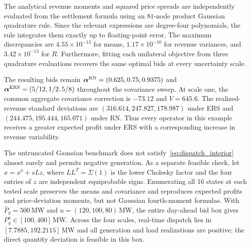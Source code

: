\documentclass[journal]{IEEEtran}
\begin{document}
\begin{table}[t]
\centering
\caption{Uncertainty sensitivity: full expected profits, including covariance offsets. Standard deviations are scaled by $s$; forecast means and prescribed coefficients are fixed.}
\label{tab:uncertainty_sensitivity}
\end{table}

The analytical revenue moments and squared price spreads are independently evaluated from the settlement formula using an $81$-node product Gaussian quadrature rule. Since the relevant expressions are degree-four polynomials, the rule integrates them exactly up to floating-point error. The maximum discrepancies are $4.55\times10^{-13}$ for means, $1.17\times10^{-10}$ for revenue variances, and $3.42\times10^{-13}$ for $R$. Furthermore, fitting each unilateral objective from three quadrature evaluations recovers the same optimal bids at every uncertainty scale.

The resulting bids remain $\boldsymbol\alpha^{\rm RN}=(0.625,0.75,0.9375)$ and $\boldsymbol\alpha^{\rm ERS}=(5/12,1/2,5/8)$ throughout the covariance sweep. At scale one, the common aggregate covariance correction is $-73.12$ and $V=645.6$. The realized-revenue standard deviations are $(316.614,247.827,178.987)$ under ERS and $(244.475,195.444,165.071)$ under RN. Thus every operator in this example receives a greater expected profit under ERS with a corresponding increase in revenue variability.

The untruncated Gaussian benchmark does not satisfy~\eqref{eq:dispatch_interior} almost surely and permits negative generation. As a separate feasible check, let $x=x^o+sLz$, where $LL^T=\Sigma(1)$ is the lower Cholesky factor and the four entries of $z$ are independent equiprobable signs. Enumerating all 16 states at each tested scale preserves the means and covariance and reproduces expected profits and price-deviation moments, but not Gaussian fourth-moment formulas. With $\bar P_g=500$\,MW and $u=(120,100,80)$\,MW, the entire day-ahead bid box gives $P_g^o\in[100,400]$\,MW. Across the four scales, real-time dispatch lies in $[7.7885,192.2115]$\,MW and all generation and load realizations are positive; the direct quantity deviation is feasible in this box.
\end{document}
